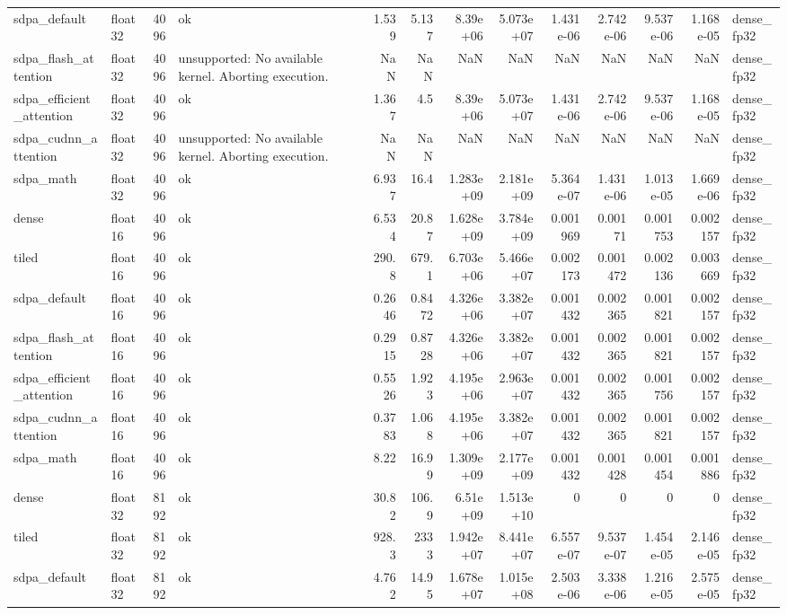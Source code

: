 \begin{table}
\begin{tabular}{llrlrrrrrrrrl}
sdpa\_default & float32 & 4096 & ok & 1.539 & 5.137 & 8.39e+06 & 5.073e+07 & 1.431e-06 & 2.742e-06 & 9.537e-06 & 1.168e-05 & dense\_fp32 \\
sdpa\_flash\_attention & float32 & 4096 & unsupported: No available kernel. Aborting execution. & NaN & NaN & NaN & NaN & NaN & NaN & NaN & NaN & dense\_fp32 \\
sdpa\_efficient\_attention & float32 & 4096 & ok & 1.367 & 4.5 & 8.39e+06 & 5.073e+07 & 1.431e-06 & 2.742e-06 & 9.537e-06 & 1.168e-05 & dense\_fp32 \\
sdpa\_cudnn\_attention & float32 & 4096 & unsupported: No available kernel. Aborting execution. & NaN & NaN & NaN & NaN & NaN & NaN & NaN & NaN & dense\_fp32 \\
sdpa\_math & float32 & 4096 & ok & 6.937 & 16.4 & 1.283e+09 & 2.181e+09 & 5.364e-07 & 1.431e-06 & 1.013e-05 & 1.669e-06 & dense\_fp32 \\
dense & float16 & 4096 & ok & 6.534 & 20.87 & 1.628e+09 & 3.784e+09 & 0.001969 & 0.00171 & 0.001753 & 0.002157 & dense\_fp32 \\
tiled & float16 & 4096 & ok & 290.8 & 679.1 & 6.703e+06 & 5.466e+07 & 0.002173 & 0.001472 & 0.002136 & 0.003669 & dense\_fp32 \\
sdpa\_default & float16 & 4096 & ok & 0.2646 & 0.8472 & 4.326e+06 & 3.382e+07 & 0.001432 & 0.002365 & 0.001821 & 0.002157 & dense\_fp32 \\
sdpa\_flash\_attention & float16 & 4096 & ok & 0.2915 & 0.8728 & 4.326e+06 & 3.382e+07 & 0.001432 & 0.002365 & 0.001821 & 0.002157 & dense\_fp32 \\
sdpa\_efficient\_attention & float16 & 4096 & ok & 0.5526 & 1.923 & 4.195e+06 & 2.963e+07 & 0.001432 & 0.002365 & 0.001756 & 0.002157 & dense\_fp32 \\
sdpa\_cudnn\_attention & float16 & 4096 & ok & 0.3783 & 1.068 & 4.195e+06 & 3.382e+07 & 0.001432 & 0.002365 & 0.001821 & 0.002157 & dense\_fp32 \\
sdpa\_math & float16 & 4096 & ok & 8.22 & 16.99 & 1.309e+09 & 2.177e+09 & 0.001432 & 0.001428 & 0.001454 & 0.001886 & dense\_fp32 \\
dense & float32 & 8192 & ok & 30.82 & 106.9 & 6.51e+09 & 1.513e+10 & 0 & 0 & 0 & 0 & dense\_fp32 \\
tiled & float32 & 8192 & ok & 928.3 & 2333 & 1.942e+07 & 8.441e+07 & 6.557e-07 & 9.537e-07 & 1.454e-05 & 2.146e-05 & dense\_fp32 \\
sdpa\_default & float32 & 8192 & ok & 4.762 & 14.95 & 1.678e+07 & 1.015e+08 & 2.503e-06 & 3.338e-06 & 1.216e-05 & 2.575e-05 & dense\_fp32 \\

\end{tabular}
\end{table}

